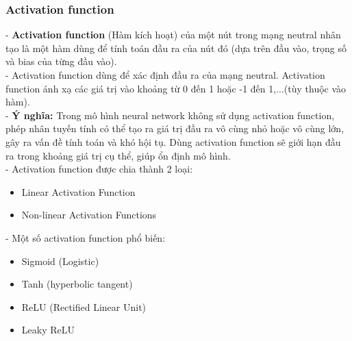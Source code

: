 \subsubsection{Activation function}
- \textbf{Activation function} (Hàm kích hoạt) của một nút trong mạng neutral nhân tạo là một hàm dùng để tính toán đầu ra của nút đó (dựa trên đầu vào, trọng số và bias của từng đầu vào).\\
- Activation function dùng để xác định đầu ra của mạng neutral. Activation function ánh xạ các giá trị vào khoảng từ 0 đến 1 hoặc -1 đến 1,...(tùy thuộc vào hàm).\\
- \textbf{Ý nghĩa:} Trong mô hình neural network không sử dụng activation function, phép nhân tuyến tính có thể tạo ra giá trị đầu ra vô cùng nhỏ hoặc vô cùng lớn, gây ra vấn đề tính toán và khó hội tụ. Dùng activation function sẽ giới hạn đầu ra trong khoảng giá trị cụ thể, giúp ổn định mô hình.
\\- Activation function được chia thành 2 loại: 
\begin{itemize}
    \item Linear Activation Function
    \item Non-linear Activation Functions
\end{itemize}

- Một số activation function phổ biến: 
\begin{itemize}
    \item Sigmoid (Logistic)
    \item Tanh (hyperbolic tangent)
    \item ReLU (Rectified Linear Unit)
    \item Leaky ReLU
\end{itemize}

